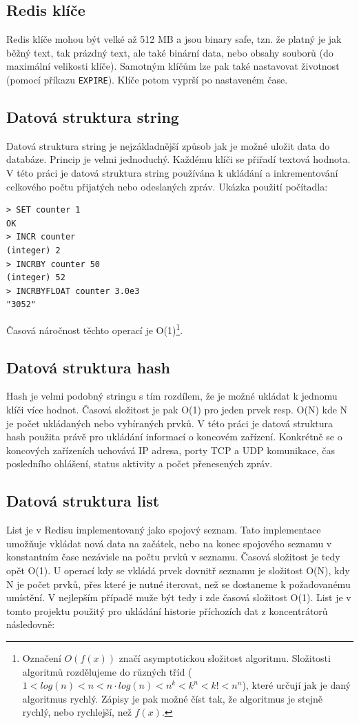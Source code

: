 \subsection{Redis klíče}
Redis klíče mohou být velké až 512 MB a jsou binary safe, tzn. že platný je jak běžný text, tak prázdný text, ale také binární data, nebo obsahy souborů (do maximální velikosti klíče). Samotným klíčům lze pak také nastavovat životnost (pomocí příkazu \texttt{EXPIRE}). Klíče potom vyprší po nastaveném čase.

\subsection{Datová struktura string}
Datová struktura string je nejzákladnější způsob jak je možné uložit data do databáze. Princip je velmi jednoduchý. Každému klíči se přiřadí textová hodnota. V této práci je datová struktura string používána k ukládání a inkrementování celkového počtu přijatých nebo odeslaných zpráv. Ukázka použití počítadla:

\begin{verbatim}
> SET counter 1
OK
> INCR counter
(integer) 2
> INCRBY counter 50
(integer) 52
> INCRBYFLOAT counter 3.0e3
"3052"
\end{verbatim}

Časová náročnost těchto operací je O(1)\footnote{Označení $O(f(x))$ značí asymptotickou složitost algoritmu. Složitosti algoritmů rozdělujeme do různých tříd ($1 < log(n) < n < n\cdot log(n) < n^k < k^n < k! < n^n$), které určují jak je daný algoritmus rychlý. Zápisy je pak možné číst tak, že algoritmus je stejně rychlý, nebo rychlejší, než $f(x)$.}.

\subsection{Datová struktura hash}
Hash je velmi podobný stringu s tím rozdílem, že je možné ukládat k jednomu klíči více hodnot. Časová složitost je pak O(1) pro jeden prvek resp. O(N) kde N je počet ukládaných nebo vybíraných prvků. V této práci je datová struktura hash použita právě pro ukládání informací o koncovém zařízení. Konkrétně se o koncových zařízeních uchovává IP adresa, porty TCP a UDP komunikace, čas posledního ohlášení, status aktivity a počet přenesených zpráv.

\subsection{Datová struktura list}
List je v Redisu implementovaný jako spojový seznam. Tato implementace umožňuje vkládat nová data na začátek, nebo na konec spojového seznamu v konstantním čase nezávisle na počtu prvků v seznamu. Časová složitost je tedy opět O(1). U operací kdy se vkládá prvek dovnitř seznamu je složitost O(N), kdy N je počet prvků, přes které je nutné iterovat, než se dostaneme k požadovanému umístění. V nejlepším případě muže být tedy i zde časová složitost O(1). List je v tomto projektu použitý pro ukládání historie příchozích dat z koncentrátorů následovně:

